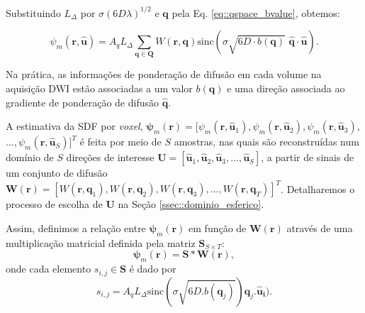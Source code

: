 \documentclass[
    12pt,                %
    oneside,            %
    a4paper,            %
    english,            %
    french,                %
    spanish,            %
    brazil                %
    ]{abntex2}
\begin{document}
Substituindo $L_{\Delta}$ por $\sigma(6D\lambda)^{1/2}$ e $\mathbf{q}$ pela Eq. \ref{eq::qspace_bvalue}, obtemos:



\begin{equation}
\label{eq::sdf_discrete_2}
    \psi_m(\mathbf{r}, \mathbf{\hat{u}}) =
    A_qL_{\Delta}\sum_{\mathbf{q} \in \mathbf{Q}}W(\mathbf{r}, \mathbf{q})\text{sinc}(\sigma \sqrt{6D\cdot b(\mathbf{q})}\,\,  \mathbf{\hat{q}}\cdot\mathbf{\hat{u}}) .
\end{equation}

 Na prática, as informações de ponderação de difusão em cada volume na aquisição DWI estão associadas a um valor $b(\mathbf{q})$ e uma direção associada ao gradiente de ponderação de difusão $\mathbf{\hat{q}}$.%

A estimativa da SDF por \textit{voxel}, 
$\boldsymbol{\psi}_m(\mathbf{r}) = [
\psi_m(\mathbf{r}, \mathbf{\hat{u}}_1), 
\psi_m(\mathbf{r}, \mathbf{\hat{u}}_2), 
\psi_m(\mathbf{r}, \mathbf{\hat{u}}_3),$
$ ..., 
\psi_m(\mathbf{r}, \mathbf{\hat{u}}_S)
]^T$
é feita por meio de $S$ amostras, nas quais são reconstruídas num domínio de $S$ direções de interesse $\mathbf{U} = [
\mathbf{\hat{u}}_1, 
\mathbf{\hat{u}}_2, 
\mathbf{\hat{u}}_3, \dots, 
\mathbf{\hat{u}}_S 
]$, a partir de sinais de um conjunto de difusão $\mathbf{W}(\mathbf{r}) = [
W(\mathbf{r},\mathbf{q}_1),
W(\mathbf{r},\mathbf{q}_2),
W(\mathbf{r},\mathbf{q}_3), \dots ,
W(\mathbf{r},\mathbf{q}_T)
]^T$. Detalharemos o processo de escolha de $\mathbf{U}$ na Seção \ref{ssec::dominio_esferico}.

Assim, definimos a relação entre $\boldsymbol{\psi}_m(\mathbf{r})$ em função de $\mathbf{W}(\mathbf{r})$ através de uma multiplicação matricial definida pela matriz $\mathbf{S}_{S\times T}$:
\begin{equation}
\label{eq::gqi_vec}
    \boldsymbol{\psi}_m(\mathbf{r}) = \mathbf{S}*\mathbf{W}(\mathbf{r}) ,
\end{equation}
onde cada elemento $s_{i,j} \in \mathbf{S}$ é dado por
\begin{equation}
\label{eq::s_ij}
s_{i,j} = A_qL_{\Delta}\text{sinc}(\sigma \sqrt{6D.b(\mathbf{q}_j)} )\mathbf{\hat{q}}_j.\mathbf{\hat{u}_i}) .
\end{equation}
\end{document}
